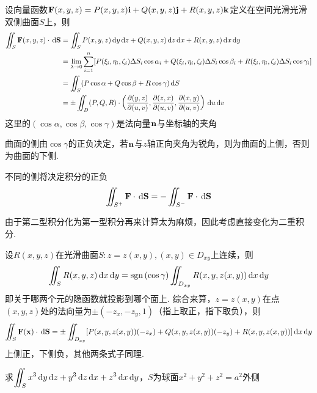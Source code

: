\begin{definition}[第二型曲面积分]
设向量函数$\mathbf{F}(x,y,z)=P(x,y,z)\mathbf{i}+Q(x,y,z)\mathbf{j}+R(x,y,z)\mathbf{k}$定义在空间光滑光滑双侧曲面$S$上，则
\[\begin{aligned}
\iint_S\mathbf{F}(x,y,z)\cdot\,\mathrm{d}\mathbf{S}&=\iint_SP(x,y,z)\,\mathrm{d} y\,\mathrm{d} z+Q(x,y,z)\,\mathrm{d} z\,\mathrm{d} x+R(x,y,z)\,\mathrm{d} x\,\mathrm{d} y\\
&=\lim_{\lambda\to 0}\sum_{i=1}^n[P(\xi_i,\eta_i,\zeta_i)\Delta S_i\cos\alpha_i+Q(\xi_i,\eta_i,\zeta_i)\Delta S_i\cos\beta_i+R(\xi_i,\eta_i,\zeta_i)\Delta S_i\cos\gamma_i]\\
&=\iint_S(P\cos\alpha+Q\cos\beta+R\cos\gamma)\,\mathrm{d} S\\
&=\pm\iint_D (P,Q,R)\cdot\left(\dfrac{\partial (y,z)}{\partial (u,v)},\dfrac{\partial (z,x)}{\partial (u,v)},\dfrac{\partial (x,y)}{\partial (u,v)}\right)\,\mathrm{d} u\,\mathrm{d} v
\end{aligned}\]
这里的$(\cos\alpha,\cos\beta,\cos\gamma)$是法向量$\mathbf{n}$与坐标轴的夹角
\end{definition}
\par 曲面的侧由$\cos\gamma$的正负决定，若$\mathbf{n}$与$z$轴正向夹角为锐角，则为曲面的上侧，否则为曲面的下侧.
\par 不同的侧将决定积分的正负
\[\iint_{S^+}\mathbf{F}\cdot\,\mathrm{d}\mathbf{S}=-\iint_{S^-}\mathbf{F}\cdot\,\mathrm{d}\mathbf{S}\]
\par 由于第二型积分化为第一型积分再来计算太为麻烦，因此考虑直接变化为二重积分.
\begin{theorem}
\label{thm:surface_integral_to_double}
设$R(x,y,z)$在光滑曲面$S:z=z(x,y),(x,y)\in {D_{xy}}$上连续，则
\[\iint_SR(x,y,z)\,\mathrm{d} x\,\mathrm{d} y=\mathrm{sgn}\,(\cos\gamma)\iint_{D_{xy}}R(x,y,z(x,y))\,\mathrm{d} x\,\mathrm{d} y\]
即关于哪两个元的隐函数就投影到哪个面上.
综合来算，$z=z(x,y)$在点$(x,y,z)$处的法向量为$\pm(-z_x,-z_y,1)$（指上取正，指下取负），则
\[\iint_S\mathbf{F}(\mathbf{x})\cdot\,\mathrm{d}\mathbf{S}=\pm\iint_{D_{xy}}[P(x,y,z(x,y))(-z_x)+Q(x,y,z(x,y))(-z_y)+R(x,y,z(x,y))]\,\mathrm{d} x\,\mathrm{d} y\]
上侧正，下侧负，其他两条式子同理.
\end{theorem}
\begin{example}
求$\displaystyle\iint_Sx^3\,\mathrm{d} y\,\mathrm{d} z+y^3\,\mathrm{d} z\,\mathrm{d} x+z^3\,\mathrm{d} x\,\mathrm{d} y$，$S$为球面$x^2+y^2+z^2=a^2$外侧
\end{example}
